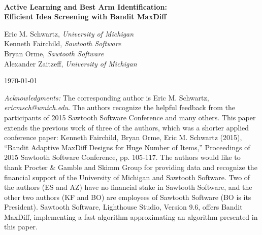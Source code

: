 \documentclass[nonblindrev]{informs3}
\newcommand{\titleofthispaper}{
	\textbf{Active Learning and Best Arm Identification: \\
	Efficient Idea Screening with Bandit MaxDiff} 
}
\begin{document}

\begin{center}

	~ \\

	\vspace{2in}

	\titleofthispaper

	\vspace{1in}

	{Eric M. Schwartz,}
	\emph{University of Michigan} \\
	{Kenneth Fairchild,} 
	\emph{Sawtooth Software} \\
	{Bryan Orme,}
	\emph{Sawtooth Software} \\
	{Alexander Zaitzeff,}
	\emph{University of Michigan} 

	\vspace{0.5in}

	\today
	\vspace{1in}
 \end{center}

\SingleSpacedXI

\small
\noindent \emph{Acknowledgments:} 
The corresponding author is Eric M. Schwartz, \emph{ericmsch@umich.edu}. The authors recognize the helpful feedback from the participants of 2015 Sawtooth Software Conference and many others. This paper extends the previous work of three of the authors, which was a shorter applied conference paper: Kenneth Fairchild, Bryan Orme, Eric M. Schwartz (2015), ``Bandit Adaptive MaxDiff Designs for Huge Number of Items,'' Proceedings of 2015 Sawtooth Software Conference, pp. 105-117. The authors would like to thank Procter \& Gamble and Skimm Group for providing data and recognize the financial support of the University of Michigan and Sawtooth Software. Two of the authors (ES and AZ) have no financial stake in Sawtooth Software, and the other two authors (KF and BO) are employees of Sawtooth Software (BO is its President). Sawtooth Software, Lighthouse Studio, Version 9.6, offers Bandit MaxDiff, implementing a fast algorithm approximating an algorithm presented in this paper.
\normalsize	


% 
\end{document}
